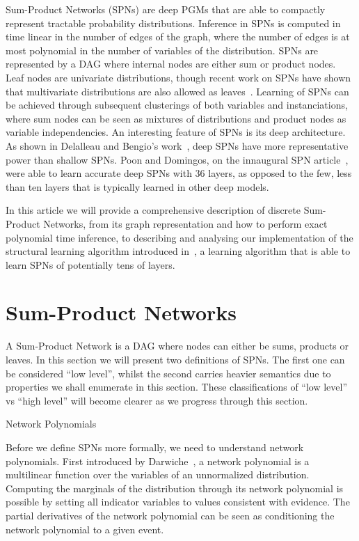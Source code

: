 \documentclass{amsart}
\makeatletter
\def\subsection{\@startsection{subsection}{3}%
  \z@{.5\linespacing\@plus.7\linespacing}{.1\linespacing}%
  {\normalfont\itshape}}
\theoremstyle{plain}
\numberwithin{equation}{section}
\makeatother
\begin{document}
Sum-Product Networks (SPNs) are deep PGMs that are able to compactly represent tractable
probability distributions. Inference in SPNs is computed in time linear in the number of edges of
the graph, where the number of edges is at most polynomial in the number of variables of the
distribution. SPNs are represented by a DAG where internal nodes are either sum or product nodes.
Leaf nodes are univariate distributions, though recent work on SPNs have shown that multivariate
distributions are also allowed as leaves~\cite{id-spn}. Learning of SPNs can be achieved through
subsequent clusterings of both variables and instanciations, where sum nodes can be seen as
mixtures of distributions and product nodes as variable independencies. An interesting feature of
SPNs is its deep architecture. As shown in Delalleau and Bengio's work~\cite{shallow-vs-deep},
deep SPNs have more representative power than shallow SPNs. Poon and Domingos, on the innaugural
SPN article~\cite{poon-domingos}, were able to learn accurate deep SPNs with 36 layers, as opposed
to the few, less than ten layers that is typically learned in other deep models.

In this article we will provide a comprehensive description of discrete Sum-Product Networks, from
its graph representation and how to perform exact polynomial time inference, to describing and
analysing our implementation of the structural learning algorithm introduced
in~\cite{gens-domingos}, a learning algorithm that is able to learn SPNs of potentially tens of
layers.

\section{Sum-Product Networks}

A Sum-Product Network is a DAG where nodes can either be sums, products or leaves. In this section
we will present two definitions of SPNs. The first one can be considered ``low level'', whilst the
second carries heavier semantics due to properties we shall enumerate in this section. These
classifications of ``low level'' vs ``high level'' will become clearer as we progress through this
section.

\subsection{Network Polynomials}

Before we define SPNs more formally, we need to understand network polynomials. First introduced by
Darwiche~\cite{diff-approach-darwiche}, a network polynomial is a multilinear function over the
variables of an unnormalized distribution. Computing the marginals of the distribution through its
network polynomial is possible by setting all indicator variables to values consistent with
evidence. The partial derivatives of the network polynomial can be seen as conditioning the network
polynomial to a given event.
\end{document}
